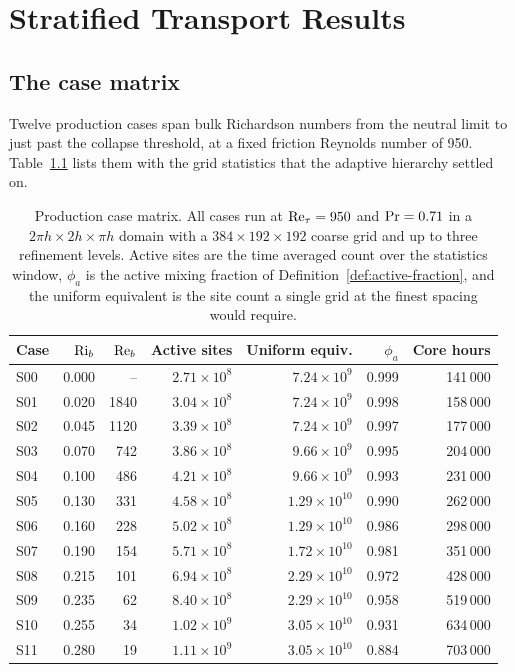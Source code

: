 \chapter{Stratified Transport Results}
\label{chap:results}

\section{The case matrix}
\label{sec:results-matrix}

Twelve production cases span bulk Richardson numbers from the neutral limit to
just past the collapse threshold, at a fixed friction Reynolds number of 950.
Table~\ref{tab:case-matrix} lists them with the grid statistics that the
adaptive hierarchy settled on.

\begin{table}[t]
\centering
\small
\caption[Production case matrix]{Production case matrix. All cases run at
$\mathrm{Re}_\tau = 950$ and $\mathrm{Pr} = 0.71$ in a $2\pi h \times 2h \times \pi h$ domain
with a $384 \times 192 \times 192$ coarse grid and up to three refinement levels.
Active sites are the time averaged count over the statistics window, $\phi_a$ is
the active mixing fraction of Definition~\ref{def:active-fraction}, and the
uniform equivalent is the site count a single grid at the finest spacing would
require.}
\label{tab:case-matrix}
\begin{tabular}{lrrrrrr}
\toprule
Case & $\mathrm{Ri}_b$ & $\mathrm{Re}_b$ & Active sites & Uniform equiv. & $\phi_a$ & Core hours \\
\midrule
S00 & 0.000 & --    & $2.71 \times 10^{8}$ & $7.24 \times 10^{9}$ & 0.999 & 141\,000 \\
S01 & 0.020 & 1840  & $3.04 \times 10^{8}$ & $7.24 \times 10^{9}$ & 0.998 & 158\,000 \\
S02 & 0.045 & 1120  & $3.39 \times 10^{8}$ & $7.24 \times 10^{9}$ & 0.997 & 177\,000 \\
S03 & 0.070 & 742   & $3.86 \times 10^{8}$ & $9.66 \times 10^{9}$ & 0.995 & 204\,000 \\
S04 & 0.100 & 486   & $4.21 \times 10^{8}$ & $9.66 \times 10^{9}$ & 0.993 & 231\,000 \\
S05 & 0.130 & 331   & $4.58 \times 10^{8}$ & $1.29 \times 10^{10}$ & 0.990 & 262\,000 \\
S06 & 0.160 & 228   & $5.02 \times 10^{8}$ & $1.29 \times 10^{10}$ & 0.986 & 298\,000 \\
S07 & 0.190 & 154   & $5.71 \times 10^{8}$ & $1.72 \times 10^{10}$ & 0.981 & 351\,000 \\
S08 & 0.215 & 101   & $6.94 \times 10^{8}$ & $2.29 \times 10^{10}$ & 0.972 & 428\,000 \\
S09 & 0.235 & 62    & $8.40 \times 10^{8}$ & $2.29 \times 10^{10}$ & 0.958 & 519\,000 \\
S10 & 0.255 & 34    & $1.02 \times 10^{9}$ & $3.05 \times 10^{10}$ & 0.931 & 634\,000 \\
S11 & 0.280 & 19    & $1.11 \times 10^{9}$ & $3.05 \times 10^{10}$ & 0.884 & 703\,000 \\
\bottomrule
\end{tabular}
\end{table}

